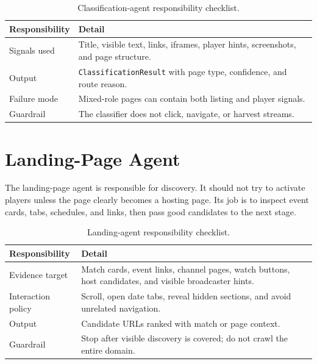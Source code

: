 

\begin{table}[!htbp]
\centering
\begin{tabularx}{\textwidth}{Q{3.5cm}Y}
\toprule
{}
Responsibility & Detail \\
\midrule
Signals used & Title, visible text, links, iframes, player hints, screenshots,
and page structure. \\
Output & \texttt{ClassificationResult} with page type, confidence, and route
reason. \\
Failure mode & Mixed-role pages can contain both listing and player signals. \\
Guardrail & The classifier does not click, navigate, or harvest streams. \\
\bottomrule
\end{tabularx}
\caption{Classification-agent responsibility checklist.}
\label{tab:appendix-classification-checklist}
\end{table}

\section{Landing-Page Agent}

The landing-page agent is responsible for discovery. It should not try to
activate players unless the page clearly becomes a hosting page. Its job is to
inspect event cards, tabs, schedules, and links, then pass good candidates to
the next stage.



\begin{table}[!htbp]
\centering
\begin{tabularx}{\textwidth}{Q{3.5cm}Y}
\toprule
{}
Responsibility & Detail \\
\midrule
Evidence target & Match cards, event links, channel pages, watch buttons, host
candidates, and visible broadcaster hints. \\
Interaction policy & Scroll, open date tabs, reveal hidden sections, and avoid
unrelated navigation. \\
Output & Candidate URLs ranked with match or page context. \\
Guardrail & Stop after visible discovery is covered; do not crawl the entire
domain. \\
\bottomrule
\end{tabularx}
\caption{Landing-agent responsibility checklist.}
\label{tab:appendix-landing-checklist}
\end{table}

